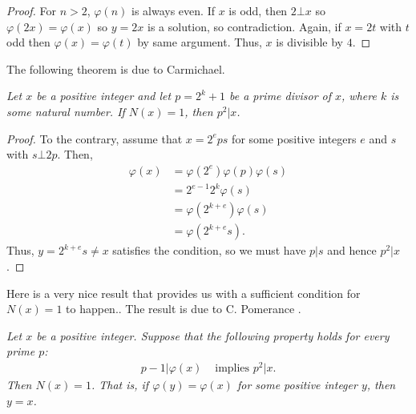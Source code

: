 \documentclass{subfile}
\begin{document}
		\begin{proof}
			For $n>2$, $\varphi(n)$ is always even. If $x$ is odd, then $2\bot x$ so $\varphi(2x)=\varphi(x)$ so $y=2x$ is a solution, so contradiction. Again, if $x=2t$ with $t$ odd then $\varphi(x)=\varphi(t)$ by same argument. Thus, $x$ is divisible by $4$.
		\end{proof}
	The following theorem is due to Carmichael.
	
		\begin{theorem} \slshape
			Let $x$ be a positive integer and let $p=2^k+1$ be a prime divisor of $x$, where $k$ is some natural number. If $N(x)=1$, then $p^2|x$.
		\end{theorem}
		
		\begin{proof}
			To the contrary, assume that $x=2^eps$ for some positive integers $e$ and $s$ with $s\bot 2p$. Then,
				\begin{align*}
					\varphi(x)  & = \varphi(2^e)\varphi(p)\varphi(s)\\
							& = 2^{e-1}2^k\varphi(s)\\
							& = \varphi(2^{k+e})\varphi(s)\\
							& = \varphi(2^{k+e}s).
				\end{align*}
			Thus, $y=2^{k+e}s\neq x$ satisfies the condition, so we must have $p|s$ and hence $p^2 | x$.
		\end{proof}
	Here is a very nice result that provides us with a sufficient condition for $N(x)=1$ to happen.. The result is due to C. Pomerance \cite{pomerance}.
		\begin{theorem}\slshape
			 Let $x$ be a positive integer. Suppose that the following property holds for every prime $p$:
				\begin{align*}
					p-1|\varphi(x)& \text{ implies } p^2|x.
				\end{align*}
			Then $N(x)=1$. That is, if $\varphi(y)=\varphi(x)$ for some positive integer $y$, then $y=x$.
		\end{theorem}
		
\end{document}
